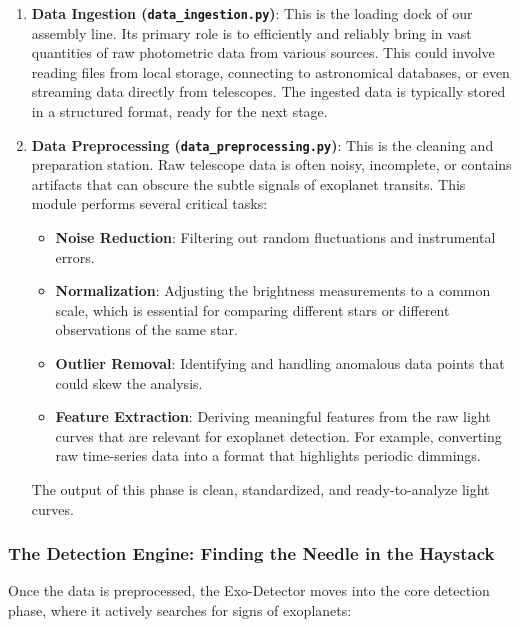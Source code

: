 \documentclass{article}
\begin{document}
\begin{enumerate}
    \item \textbf{Data Ingestion (\texttt{data\_ingestion.py})}: This is the loading dock of our assembly line. Its primary role is to efficiently and reliably bring in vast quantities of raw photometric data from various sources. This could involve reading files from local storage, connecting to astronomical databases, or even streaming data directly from telescopes. The ingested data is typically stored in a structured format, ready for the next stage.

    \item \textbf{Data Preprocessing (\texttt{data\_preprocessing.py})}: This is the cleaning and preparation station. Raw telescope data is often noisy, incomplete, or contains artifacts that can obscure the subtle signals of exoplanet transits. This module performs several critical tasks:
    \begin{itemize}
        \item \textbf{Noise Reduction}: Filtering out random fluctuations and instrumental errors.
        \item \textbf{Normalization}: Adjusting the brightness measurements to a common scale, which is essential for comparing different stars or different observations of the same star.
        \item \textbf{Outlier Removal}: Identifying and handling anomalous data points that could skew the analysis.
        \item \textbf{Feature Extraction}: Deriving meaningful features from the raw light curves that are relevant for exoplanet detection. For example, converting raw time-series data into a format that highlights periodic dimmings.
    \end{itemize}

    The output of this phase is clean, standardized, and ready-to-analyze light curves.
\end{enumerate}

\subsubsection{The Detection Engine: Finding the Needle in the Haystack}

Once the data is preprocessed, the Exo-Detector moves into the core detection phase, where it actively searches for signs of exoplanets:
\end{document}
